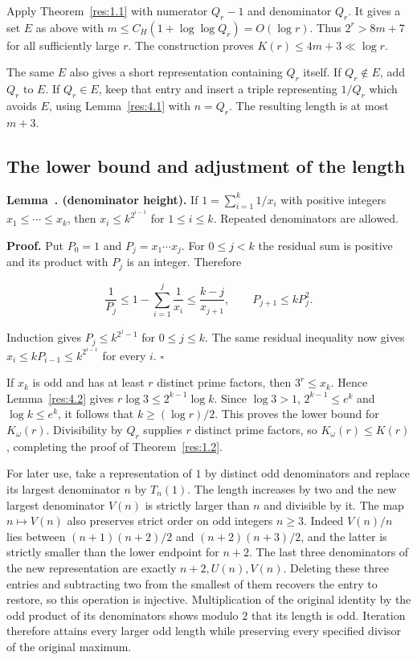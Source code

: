 \documentclass[11pt,a4paper]{article}
\newcounter{result}[section]
\renewcommand{\theresult}{\thesection.\arabic{result}}
\newcommand{\paperstatement}[3]{%
  \refstepcounter{result}\label{res:#2}%
  \noindent\textbf{#1~\theresult#3.}\enspace\ignorespaces}
\begin{document}
Apply Theorem~\ref{res:1.1} with numerator $Q_r-1$ and denominator $Q_r$. It gives a set $E$ as above with $m\le C_H(1+\log\log Q_r)=O(\log r)$. Thus $2^r>8m+7$ for all sufficiently large $r$. The construction proves $K(r)\le4m+3\ll\log r$.

The same $E$ also gives a short representation containing $Q_r$ itself. If $Q_r\notin E$, add $Q_r$ to $E$. If $Q_r\in E$, keep that entry and insert a triple representing $1/Q_r$ which avoids $E$, using Lemma~\ref{res:4.1} with $n=Q_r$. The resulting length is at most $m+3$.

\subsection{The lower bound and adjustment of the length}

\paperstatement{Lemma}{4.2}{ (denominator height)} If $1=\sum_{i=1}^k1/x_i$ with positive integers $x_1\le\cdots\le x_k$, then $x_i\le k^{2^{i-1}}$ for $1\le i\le k$. Repeated denominators are allowed.

\textbf{Proof.} Put $P_0=1$ and $P_j=x_1\cdots x_j$. For $0\le j<k$ the residual sum is positive and its product with $P_j$ is an integer. Therefore

\[
\frac1{P_j}\le 1-\sum_{i=1}^j\frac1{x_i}
     \le\frac{k-j}{x_{j+1}},\qquad P_{j+1}\le kP_j^2.
\]

Induction gives $P_j\le k^{2^j-1}$ for $0\le j\le k$. The same residual inequality now gives $x_i\le kP_{i-1}\le k^{2^{i-1}}$ for every $i$. $\square$

If $x_k$ is odd and has at least $r$ distinct prime factors, then $3^r\le x_k$. Hence Lemma~\ref{res:4.2} gives $r\log 3\le2^{k-1}\log k$. Since $\log 3>1$, $2^{k-1}\le e^k$ and $\log k\le e^k$, it follows that $k\ge(\log r)/2$. This proves the lower bound for $K_\omega(r)$. Divisibility by $Q_r$ supplies $r$ distinct prime factors, so $K_\omega(r)\le K(r)$, completing the proof of Theorem~\ref{res:1.2}.

For later use, take a representation of $1$ by distinct odd denominators and replace its largest denominator $n$ by $T_n(1)$. The length increases by two and the new largest denominator $V(n)$ is strictly larger than $n$ and divisible by it. The map $n\mapsto V(n)$ also preserves strict order on odd integers $n\ge3$. Indeed $V(n)/n$ lies between $(n+1)(n+2)/2$ and $(n+2)(n+3)/2$, and the latter is strictly smaller than the lower endpoint for $n+2$. The last three denominators of the new representation are exactly $n+2,U(n),V(n)$. Deleting these three entries and subtracting two from the smallest of them recovers the entry to restore, so this operation is injective. Multiplication of the original identity by the odd product of its denominators shows modulo $2$ that its length is odd. Iteration therefore attains every larger odd length while preserving every specified divisor of the original maximum.
\end{document}
